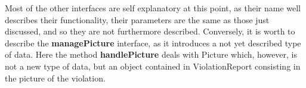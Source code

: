 \documentclass[./main.tex]{subfiles}
\begin{document}
Most of the other interfaces are self explanatory at this point, as their name well describes their functionality, their parameters are the same as those just discussed, and so they are not furthermore described. Conversely, it is worth to describe the  \textbf{managePicture} interface, as it introduces a not yet described type of data. Here the method \textbf{handlePicture} deals with Picture which, however, is not a new type of data, but an object contained in ViolationReport consisting in the picture of the violation.
\end{document}
